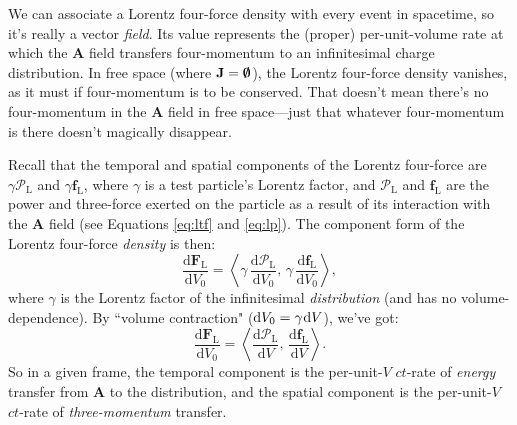 \documentclass[12pt]{article}
\renewcommand{\vv}[1]{\mathbf{#1}}
\newcommand{\dd}[1]{\mathrm{d}#1}
\begin{document}
We can associate a Lorentz four-force density with every event in spacetime, so it's really a vector \emph{field}. Its value represents the (proper) per-unit-volume rate at which the $\vv A$ field transfers four-momentum to an infinitesimal charge distribution. In free space (where $\vv J = \textrm{\mbox{\boldmath $\emptyset$}}$), the Lorentz four-force density vanishes, as it must if four-momentum is to be conserved. That doesn't mean there's no four-momentum in the $\vv A$ field in free space---just that whatever four-momentum is there doesn't magically disappear.

Recall that the temporal and spatial components of the Lorentz four-force are $\gamma \mathcal{P}_{\mathrm{L}}$ and $\gamma \vv f_{\textrm{L}}$, where $\gamma$ is a test particle's Lorentz factor, and $\mathcal{P}_{\mathrm{L}}$ and $\vv f_{\textrm{L}}$ are the power and three-force exerted on the particle as a result of its interaction with the $\vv A$ field (see Equations  \ref{eq:ltf} and \ref{eq:lp}). The component form of the Lorentz four-force \emph{density} is then:
\begin{equation*}
\dfrac{\dd \vv F_{\mathrm{L}}}{\dd V_0} = \left \langle \gamma \, \dfrac{\dd \mathcal{P}_{\textrm{L}} }{\dd V_0}, \, \gamma \, \dfrac{\dd \vv f_{\textrm{L}}}{\dd V_0} \right \rangle,
\end{equation*}
where $\gamma$ is the Lorentz factor of the infinitesimal \emph{distribution} (and has no volume-dependence). By ``volume contraction" ($\dd V_0 = \gamma \mkern1mu \dd V$), we've got:
\begin{equation}\label{eq:lffdc}
\dfrac{\dd \vv F_{\mathrm{L}}}{\dd V_0} = \left \langle \dfrac{\dd \mathcal{P}_{\mathrm{L}}}{\dd V}, \, \dfrac{\dd \vv f_{\mathrm{L}}}{\dd V} \right \rangle .
\end{equation}
So in a given frame, the temporal component is the per-unit-$V$ $ct$-rate of \emph{energy} transfer from $\vv A$ to the distribution, and the spatial component is the per-unit-$V$ $ct$-rate of \emph{three-momentum} transfer.
\end{document}
